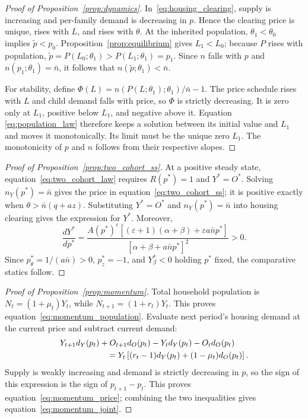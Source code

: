 \documentclass[11pt]{article}
\theoremstyle{definition}
\begin{document}
\begin{proof}[Proof of Proposition~\ref{prop:dynamics}]
In~\eqref{eq:housing_clearing}, supply is increasing and per-family demand is
decreasing in $p$. Hence the clearing price is unique, rises with $L$, and rises
with $\theta$. At the inherited population, $\theta_1<\theta_0$ implies
$\widetilde p<p_0$. Proposition~\ref{prop:equilibrium} gives $L_1<L_0$; because
$P$ rises with population, $\widetilde p=P(L_0;\theta_1)>
P(L_1;\theta_1)=p_1$. Since $n$ falls with $p$ and
$n(p_1;\theta_1)=\bar n$, it follows that
$n(\widetilde p;\theta_1)<\bar n$.

For stability, define
$\Phi(L)=n(P(L;\theta_1);\theta_1)/\bar n-1$. The price schedule rises with
$L$ and child demand falls with price, so $\Phi$ is strictly decreasing. It is
zero only at $L_1$, positive below $L_1$, and negative above it. Equation
\eqref{eq:population_law} therefore keeps a solution between its initial value
and $L_1$ and moves it monotonically. Its limit must be the unique zero $L_1$.
The monotonicity of $p$ and $n$ follows from their respective slopes.
\end{proof}

\begin{proof}[Proof of Proposition~\ref{prop:two_cohort_ss}]
At a positive steady state, equation~\eqref{eq:two_cohort_law} requires
$R(p^*)=1$ and $Y^*=O^*$. Solving $n_Y(p^*)=\bar n$ gives the price in
equation~\eqref{eq:two_cohort_ss}; it is positive exactly when
$\theta>\bar n(q+az)$. Substituting $Y^*=O^*$ and
$n_Y(p^*)=\bar n$ into housing clearing gives the expression for $Y^*$.
Moreover,
\begin{equation}
 \frac{dY^*}{dp^*}
 =\frac{A(p^*)^\varepsilon
 \left[(\varepsilon+1)(\alpha+\beta)
 +\varepsilon a\bar n p^*\right]}
 {\left[\alpha+\beta+a\bar n p^*\right]^2}>0.
 \label{eq:two_cohort_scale_slope}
\end{equation}
Since $p^*_{\theta}=1/(a\bar n)>0$, $p^*_{z}=-1$, and
$Y^*_{\beta}<0$ holding $p^*$ fixed, the comparative statics follow.
\end{proof}

\begin{proof}[Proof of Proposition~\ref{prop:momentum}]
Total household population is $N_t=(1+\mu_t)Y_t$, while
$N_{t+1}=(1+r_t)Y_t$. This proves
equation~\eqref{eq:momentum_population}. Evaluate next period's housing demand
at the current price and subtract current demand:
\begin{align}
 &Y_{t+1}d_Y(p_t)+O_{t+1}d_O(p_t)
 -Y_t d_Y(p_t)-O_t d_O(p_t) \notag\\
 &\hspace{2cm}=Y_t\left[(r_t-1)d_Y(p_t)
 +(1-\mu_t)d_O(p_t)\right].
 \label{eq:momentum_demand_change}
\end{align}
Supply is weakly increasing and demand is strictly decreasing in $p$, so the
sign of this expression is the sign of $p_{t+1}-p_t$. This proves
equation~\eqref{eq:momentum_price}; combining the two inequalities gives
equation~\eqref{eq:momentum_joint}.
\end{proof}
\end{document}
